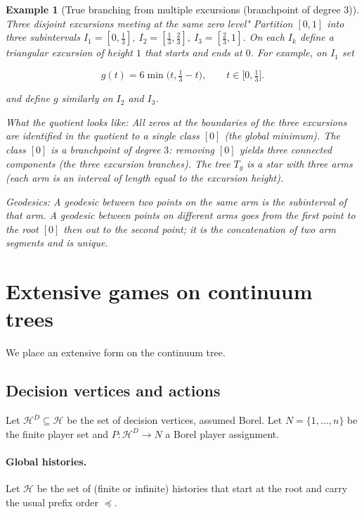 \documentclass[11pt]{article}
\newtheorem{example}[definition]{Example}
\begin{document}
\begin{example} [True branching from multiple excursions (branchpoint of degree 3)]
Three disjoint excursions meeting at the same zero level"
Partition \([0,1]\) into three subintervals \(I_1=[0,\tfrac{1}{3}],\ I_2=[\tfrac{1}{3},\tfrac{2}{3}],\ I_3=[\tfrac{2}{3},1]\). On each \(I_k\) define a triangular excursion of height \(1\) that starts and ends at \(0\). For example, on \(I_1\) set




\[
g(t)=6\min\!\bigl(t,\tfrac{1}{3}-t\bigr),\qquad t\in\bigl[0,\tfrac{1}{3}\bigr].
\]





and define \(g\) similarly on \(I_2\) and \(I_3\).

What the quotient looks like:
All zeros at the boundaries of the three excursions are identified in the quotient to a single class \([0]\) (the global minimum). The class \([0]\) is a branchpoint of degree \(3\): removing \([0]\) yields three connected components (the three excursion branches). The tree \(T_g\) is a star with three arms (each arm is an interval of length equal to the excursion height).

Geodesics:
A geodesic between two points on the same arm is the subinterval of that arm. A geodesic between points on different arms goes from the first point to the root \([0]\) then out to the second point; it is the concatenation of two arm segments and is unique.
\end{example}


\section{Extensive games on continuum trees}\label{sec:kuhn_continuum}
We place an extensive form on the continuum tree.


\subsection{Decision vertices and actions}
Let \(\mathcal H^D\subseteq\mathcal H\) be the set of decision vertices,
assumed Borel. Let \(N=\{1,\dots,n\}\) be the finite player set and
\(P:\mathcal H^D\to N\) a Borel player assignment. 



\paragraph{Global histories.}
Let \(\mathcal H\) be the set of (finite or infinite) histories that start at the root and carry the usual prefix order \(\preceq\).
\end{document}

